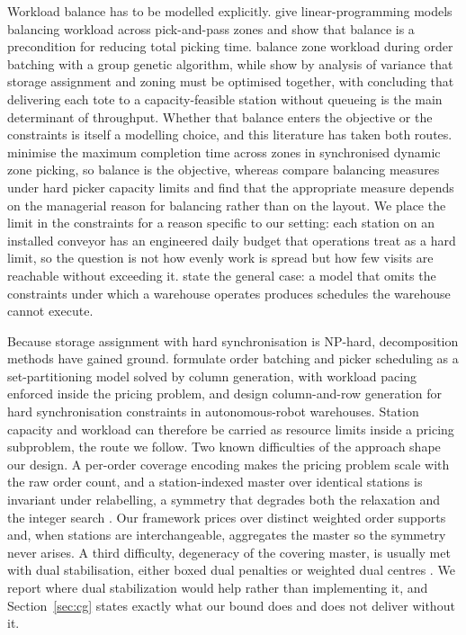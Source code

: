 \documentclass[]{interact}
\begin{document}
Workload balance has to be modelled explicitly. \citet{tarczynski2023} give linear-programming models balancing workload across pick-and-pass zones and show that balance is a precondition for reducing total picking time. \citet{pan2015} balance zone workload during order batching with a group genetic algorithm, while \citet{vanGils2018} show by analysis of variance that storage assignment and zoning must be optimised together, with \citet{boysen2023} concluding that delivering each tote to a capacity-feasible station without queueing is the main determinant of throughput. Whether that balance enters the objective or the constraints is itself a modelling choice, and this literature has taken both routes. \citet{saylam2023minmax} minimise the maximum completion time across zones in synchronised dynamic zone picking, so balance is the objective, whereas \citet{vanheusden2022workload} compare balancing measures under hard picker capacity limits and find that the appropriate measure depends on the managerial reason for balancing rather than on the layout. We place the limit in the constraints for a reason specific to our setting: each station on an installed conveyor has an engineered daily budget that operations treat as a hard limit, so the question is not how evenly work is spread but how few visits are reachable without exceeding it. \citet{vanheusden2023practical} state the general case: a model that omits the constraints under which a warehouse operates produces schedules the warehouse cannot execute.

Because storage assignment with hard synchronisation is NP-hard, decomposition methods have gained ground. \citet{muter2022} formulate order batching and picker scheduling as a set-partitioning model solved by column generation, with workload pacing enforced inside the pricing problem, and \citet{zhen2025} design column-and-row generation for hard synchronisation constraints in autonomous-robot warehouses. Station capacity and workload can therefore be carried as resource limits inside a pricing subproblem, the route we follow. Two known difficulties of the approach shape our design. A per-order coverage encoding makes the pricing problem scale with the raw order count, and a station-indexed master over identical stations is invariant under relabelling, a symmetry that degrades both the relaxation and the integer search \citep{vanderbeck2000dw}. Our framework prices over distinct weighted order supports and, when stations are interchangeable, aggregates the master so the symmetry never arises. A third difficulty, degeneracy of the covering master, is usually met with dual stabilisation, either boxed dual penalties \citep{dumerle1999stabilized} or weighted dual centres \citep{wentges1997weighted}. We report where dual stabilization would help rather than implementing it, and Section~\ref{sec:cg} states exactly what our bound does and does not deliver without it.
\end{document}
